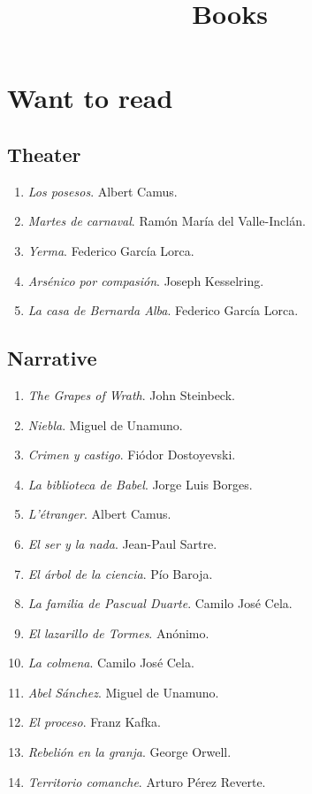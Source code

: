 \title{Books}


\section*{Want to read}

\subsection*{Theater}
\begin{enumerate}
  \item \emph{Los posesos}. Albert Camus.
  \item \emph{Martes de carnaval}. Ramón María del Valle-Inclán.
  \item \done \emph{Yerma}. Federico García Lorca.
  \item \done \emph{Arsénico por compasión}. Joseph Kesselring.
  \item \done \emph{La casa de Bernarda Alba}. Federico García Lorca.
\end{enumerate}

\subsection*{Narrative}
\begin{enumerate}
  \item \emph{The Grapes of Wrath}. John Steinbeck.
  \item \emph{Niebla}. Miguel de Unamuno.
  \item \emph{Crimen y castigo}. Fiódor Dostoyevski.
  \item \emph{La biblioteca de Babel}. Jorge Luis Borges.
  \item \emph{L'étranger}. Albert Camus.
  \item \emph{El ser y la nada}. Jean-Paul Sartre.
  \item \done \emph{El árbol de la ciencia}. Pío Baroja.
  \item \done \emph{La familia de Pascual Duarte}. Camilo José Cela.
  \item \done \emph{El lazarillo de Tormes}. Anónimo.
  \item \done \emph{La colmena}. Camilo José Cela.
  \item \done \emph{Abel Sánchez}. Miguel de Unamuno.
  \item \done \emph{El proceso}. Franz Kafka.
  \item \done \emph{Rebelión en la granja}. George Orwell.
  \item \done \emph{Territorio comanche}. Arturo Pérez Reverte.
\end{enumerate}

